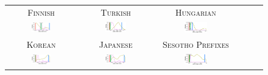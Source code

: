 \documentclass[11pt,letterpaper]{article}
\begin{document}
\begin{figure}
    \begin{center}
    \begin{tabular}{cccccc}
    \textsc{Finnish} & \textsc{Turkish} & \textsc{Hungarian} \\
        \includegraphics[width=0.3\textwidth]{figures/finnish_verbs/suffixes-byMorphemes-auc-hist-heldout-Coarse-FineSurprisal-optimized.pdf}
        &
    \includegraphics[width=0.3\textwidth]{figures/turkish_verbs/suffixes-byMorphemes-auc-hist-heldout-Coarse-FineSurprisal-optimized.pdf}
    &
    \includegraphics[width=0.3\textwidth]{figures/hungarian_verbs/suffixes-byMorphemes-auc-hist-heldout-Coarse-FineSurprisal-optimized.pdf}
    \\
    \textsc{Korean} & \textsc{Japanese} & \textsc{Sesotho Prefixes} \\
    \includegraphics[width=0.3\textwidth]{figures/korean/suffixes-byMorphemes-auc-hist-heldout-Coarse-FineSurprisal-optimized.pdf}
    &
        \includegraphics[width=0.3\textwidth]{figures/japanese/suffixes-byMorphemes-auc-hist-heldout-Coarse-FineSurprisal-optimized.pdf}
        &
            \includegraphics[width=0.3\textwidth]{figures/sesotho_prefixes/suffixes-byMorphemes-auc-hist-heldout-Coarse-FineSurprisal-optimized.pdf}

\end{tabular}
\end{center}
\end{figure}
\end{document}
